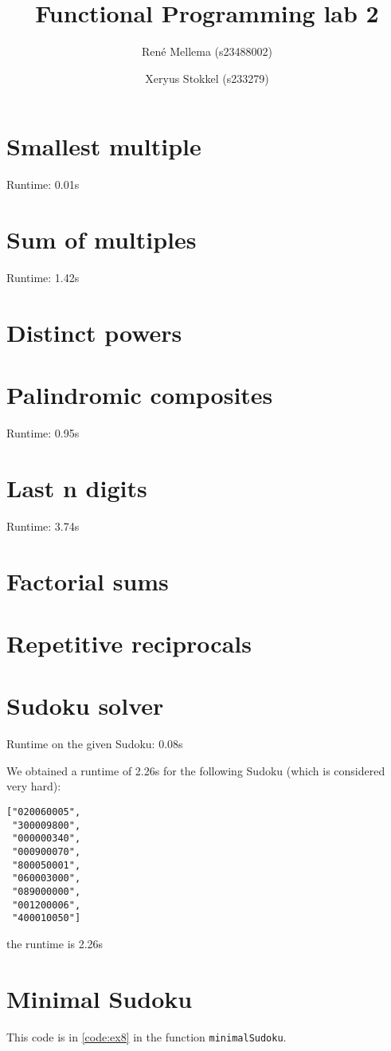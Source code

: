 \documentclass[a4paper]{article}
\title{Functional Programming lab 2}
\author{Ren\'e Mellema (s23488002) \and Xeryus Stokkel (s233279)}
\begin{document}
\maketitle

\section{Smallest multiple}

Runtime: 0.01s

\section{Sum of multiples}

Runtime: 1.42s

\section{Distinct powers}


\section{Palindromic composites}

Runtime: 0.95s

\section{Last n digits}

Runtime: 3.74s

\section{Factorial sums}


\section{Repetitive reciprocals}


\section{Sudoku solver}

Runtime on the given Sudoku: 0.08s

We obtained a runtime of 2.26s for the following Sudoku (which is considered very hard):
\begin{lstlisting}
["020060005",
 "300009800",
 "000000340",
 "000900070",
 "800050001",
 "060003000",
 "089000000",
 "001200006",
 "400010050"]
\end{lstlisting}
the runtime is 2.26s

\section{Minimal Sudoku}
This code is in \autoref{code:ex8} in the function \lstinline{minimalSudoku}.
\end{document}
